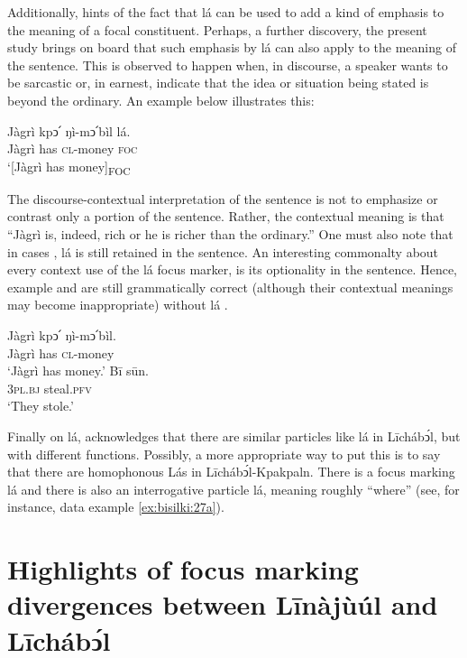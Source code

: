 \documentclass[output=paper,colorlinks,citecolor=brown]{langscibook}
\begin{document}
Additionally, \citet{Schwarz2009} hints of the fact that lá can be used to add a kind of emphasis to the meaning of a focal constituent. Perhaps, a further discovery, the present study brings on board that such emphasis by lá can also apply to the meaning of the sentence. This is observed to happen when, in discourse, a speaker wants to be sarcastic or, in earnest, indicate that the idea or situation being stated is beyond the ordinary. An example  below illustrates this:

\ea%
    \label{ex:bisilki:28}
    \gll    Jàgrì	kpↄ՛	ŋì-mↄ՛bìl	lá.\\
            Jàgrì	has	\textsc{cl-}money	\textsc{foc}\\
    \glt    ‘[Jàgrì has money]\textsubscript{FOC}
\z

The discourse-contextual interpretation of the sentence  is not to emphasize or contrast only a portion of the sentence. Rather, the contextual meaning is that “Jàgrì is, indeed, rich or he is richer than the ordinary.” One must also note that in cases , lá is still retained in the sentence. An interesting commonalty about every context use of the lá focus marker, is its optionality in the sentence. Hence, example  and  are still grammatically correct (although their contextual meanings may become inappropriate) without lá .

\ea%
    \label{ex:bisilki:29}
    \ea\label{ex:bisilki:29a}
    \gll    Jàgrì	kpↄ՛	ŋì-mↄ՛bìl.\\
            Jàgrì	has	\textsc{cl-}money\\
    \glt    ‘Jàgrì has money.’
    \ex\label{ex:bisilki:29b}
    \gll    Bī		sūn.\\
            \textsc{3pl.bj}		steal\textsc{.pfv}\\
    \glt    ‘They stole.’
    \z
\z

Finally on lá, \citet{Schwarz2009} acknowledges that there are similar particles like lá in Līchábͻ́l, but with different functions. Possibly, a more appropriate way to put this is to say that there are homophonous Lás in Līchábͻ́l-Kpakpaln. There is a focus marking lá and there is also an interrogative particle lá, meaning roughly “where” (see, for instance, data example \ref{ex:bisilki:27a}).

\section{Highlights of focus marking divergences between Līnàjùúl and Līchábͻ́l
}\label{sec:bisilki:8}
\end{document}
